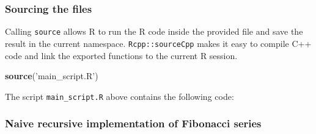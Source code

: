 \documentclass[]{article}
\newenvironment{Shaded}{\begin{snugshade}}{\end{snugshade}}
\newcommand{\KeywordTok}[1]{\textcolor[rgb]{0.13,0.29,0.53}{\textbf{#1}}}
\newcommand{\DataTypeTok}[1]{\textcolor[rgb]{0.13,0.29,0.53}{#1}}
\newcommand{\StringTok}[1]{\textcolor[rgb]{0.31,0.60,0.02}{#1}}
\newcommand{\CommentTok}[1]{\textcolor[rgb]{0.56,0.35,0.01}{\textit{#1}}}
\newcommand{\ControlFlowTok}[1]{\textcolor[rgb]{0.13,0.29,0.53}{\textbf{#1}}}
\newcommand{\OperatorTok}[1]{\textcolor[rgb]{0.81,0.36,0.00}{\textbf{#1}}}
\newcommand{\NormalTok}[1]{#1}
\begin{document}
\newpage

\subsubsection{Sourcing the files}\label{sourcing-the-files}

Calling \texttt{source} allows R to run the R code inside the provided
file and save the result in the current namespace.
\texttt{Rcpp::sourceCpp} makes it easy to compile C++ code and link the
exported functions to the current R session.

\begin{Shaded}
\begin{Highlighting}[]
\KeywordTok{source}\NormalTok{(}\StringTok{'main_script.R'}\NormalTok{)}
\end{Highlighting}
\end{Shaded}

The script \texttt{main\_script.R} above contains the following code:

\begin{Shaded}
\end{Shaded}

\newpage

\subsubsection{Naive recursive implementation of Fibonacci
series}\label{naive-recursive-implementation-of-fibonacci-series}
\end{document}
